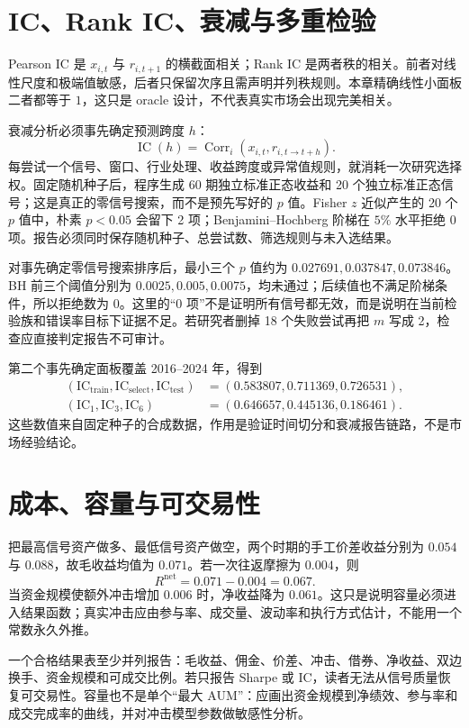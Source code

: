 \section{IC、Rank IC、衰减与多重检验}

Pearson IC 是 $x_{i,t}$ 与 $r_{i,t+1}$ 的横截面相关；Rank IC 是两者秩的相关。前者对线性尺度和极端值敏感，后者只保留次序且需声明并列秩规则。本章精确线性小面板二者都等于 $1$，这只是 oracle 设计，不代表真实市场会出现完美相关。

衰减分析必须事先确定预测跨度 $h$：
\[
 \operatorname{IC}(h)=\operatorname{Corr}_i(x_{i,t},r_{i,t\to t+h}).
\]
每尝试一个信号、窗口、行业处理、收益跨度或异常值规则，就消耗一次研究选择权。固定随机种子后，程序生成 60 期独立标准正态收益和 20 个独立标准正态信号；这是真正的零信号搜索，而不是预先写好的 $p$ 值。Fisher $z$ 近似产生的 20 个 $p$ 值中，朴素 $p<0.05$ 会留下 2 项；Benjamini--Hochberg 阶梯在 $5\%$ 水平拒绝 0 项。报告必须同时保存随机种子、总尝试数、筛选规则与未入选结果\cite{white2000reality,bailey2017backtest}。

对事先确定零信号搜索排序后，最小三个 $p$ 值约为 $0.027691,0.037847,0.073846$。BH 前三个阈值分别为 $0.0025,0.005,0.0075$，均未通过；后续值也不满足阶梯条件，所以拒绝数为 0。这里的“0 项”不是证明所有信号都无效，而是说明在当前检验族和错误率目标下证据不足。若研究者删掉 18 个失败尝试再把 $m$ 写成 2，检查应直接判定报告不可审计。

第二个事先确定面板覆盖 2016--2024 年，得到
\[
\begin{aligned}
(\mathrm{IC}_{\mathrm{train}},\mathrm{IC}_{\mathrm{select}},\mathrm{IC}_{\mathrm{test}})
  &=(0.583807,0.711369,0.726531),\\
(\mathrm{IC}_{1},\mathrm{IC}_{3},\mathrm{IC}_{6})
  &=(0.646657,0.445136,0.186461).
\end{aligned}
\]
这些数值来自固定种子的合成数据，作用是验证时间切分和衰减报告链路，不是市场经验结论。

\section{成本、容量与可交易性}

把最高信号资产做多、最低信号资产做空，两个时期的手工价差收益分别为 $0.054$ 与 $0.088$，故毛收益均值为 $0.071$。若一次往返摩擦为 $0.004$，则
\[
 R^{\mathrm{net}}=0.071-0.004=0.067.
\]
当资金规模使额外冲击增加 $0.006$ 时，净收益降为 $0.061$。这只是说明容量必须进入结果函数；真实冲击应由参与率、成交量、波动率和执行方式估计，不能用一个常数永久外推。

一个合格结果表至少并列报告：毛收益、佣金、价差、冲击、借券、净收益、双边换手、资金规模和可成交比例。若只报告 Sharpe 或 IC，读者无法从信号质量恢复可交易性。容量也不是单个“最大 AUM”：应画出资金规模到净绩效、参与率和成交完成率的曲线，并对冲击模型参数做敏感性分析。

